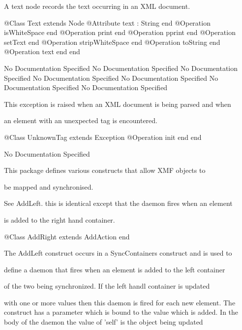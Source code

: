       A text node records the text occurring in an XML document.
\begin{Interface}
@Class Text extends Node
  @Attribute text : String end
  @Operation isWhiteSpace end
  @Operation print end
  @Operation pprint end
  @Operation setText end
  @Operation stripWhiteSpace end
  @Operation toString end
  @Operation text end
end
\end{Interface}
No Documentation Specified
No Documentation Specified
No Documentation Specified
No Documentation Specified
No Documentation Specified
No Documentation Specified
No Documentation Specified

      This exception is raised when an XML document is being parsed and when

      an element with an unexpected tag is encountered.
\begin{Interface}
@Class UnknownTag extends Exception
  @Operation init end
end
\end{Interface}
No Documentation Specified

      This package defines various constructs that allow XMF objects to

      be mapped and synchronised.

      See AddLeft. this is identical except that the daemon fires when an element

      is added to the right hand container.
\begin{Interface}
@Class AddRight extends AddAction
end
\end{Interface}

      The AddLeft construct occurs in a SyncContainers construct and is used to

      define a daemon that fires when an element is added to the left container

      of the two being synchronized. If the left handl container is updated

      with one or more values then this daemon is fired for each new element.
      The construct has a parameter which is bound to the value which is added.
      In the body of the daemon the value of 'self' is the object being updated

